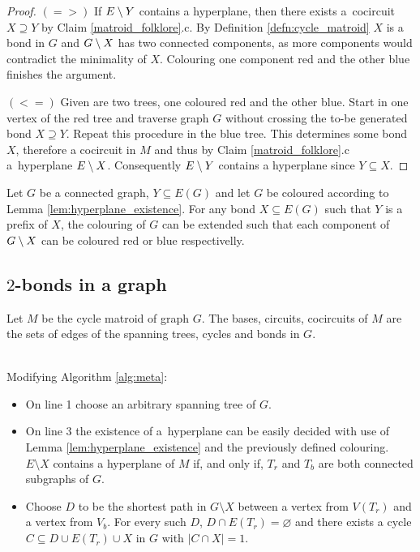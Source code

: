 \begin{proof}
	$(=>)$
	If $E \setminus Y$ contains a hyperplane, then there exists a~cocircuit $X \supseteq Y$ by Claim \ref{matroid_folklore}.c. By Definition \ref{defn:cycle_matroid} $X$ is a bond in $G$ and $G \setminus X$ has two connected components, as more components would contradict the minimality of $X$. Colouring one component red and the other blue finishes the argument.

	$(<=)$ Given are two trees, one coloured red and the other blue. Start in one vertex of the red tree and traverse graph $G$ without crossing the to-be generated bond $X \supseteq Y$. Repeat this procedure in the blue tree. This determines some bond $X$, therefore a cocircuit in $M$ and thus by Claim \ref{matroid_folklore}.c a~hyperplane $E \setminus X$. Consequently $E \setminus Y$ contains a hyperplane since $Y \subseteq X$.
\end{proof}

\begin{cor}
	Let $G$ be a connected graph, $Y \subseteq E(G)$ and let $G$ be coloured according to Lemma \ref{lem:hyperplane_existence}. For any bond $X \subseteq E(G)$ such that $Y$ is a prefix of $X$, the colouring of $G$ can be extended such that each component of $G \setminus X$ can be coloured red or blue respectivelly.
\end{cor}

\subsection*{$2$-bonds in a graph}


\begin{rec}
	Let $M$ be the cycle matroid of graph $G$. The bases, circuits, cocircuits of $M$ are the sets of edges of the spanning trees, cycles and bonds in $G$.
\end{rec}

\begin{ams_algorithm}
	\label{alg:2bonds}
	\hfill \\
	Modifying Algorithm \ref{alg:meta}:

	\begin{itemize}
		\item On line 1 choose an arbitrary spanning tree of $G$.

		\item On line 3 the existence of a~hyperplane can be easily decided with use of Lemma \ref{lem:hyperplane_existence} and the previously defined colouring. $E \setminus X$ contains a hyperplane of $M$ if, and only if, $T_r$ and $T_b$ are both connected subgraphs of $G$.

		\item Choose $D$ to be the shortest path in $G \setminus X$ between a vertex from $V(T_r)$ and a vertex from $V_b$.
			For every such $D$, $D \cap E(T_r) = \varnothing$ and there exists a cycle $C \subseteq D \cup E(T_r) \cup X$ in $G$ with $\lvert C \cap X \rvert = 1$.

	\end{itemize}
\end{ams_algorithm}

